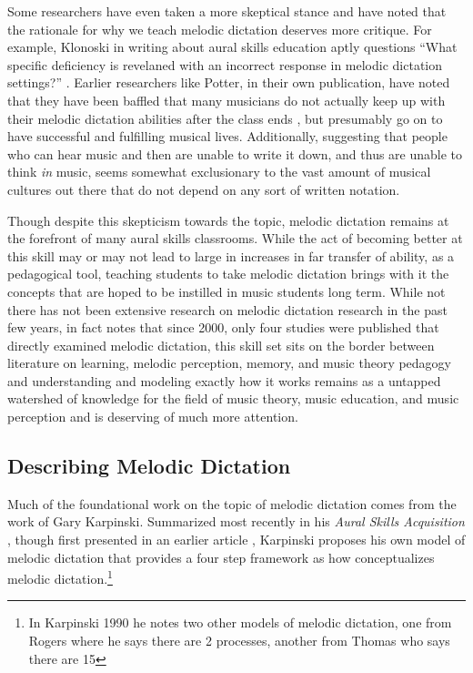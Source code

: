 \documentclass[]{book}
\let\rmarkdownfootnote\footnote%
\def\footnote{\protect\rmarkdownfootnote}
\theoremstyle{definition}
\theoremstyle{definition}
\theoremstyle{definition}
\theoremstyle{remark}
\begin{document}
Some researchers have even taken a more skeptical stance and have noted
that the rationale for why we teach melodic dictation deserves more
critique. For example, Klonoski in writing about aural skills education
aptly questions ``What specific deficiency is revelaned with an
incorrect response in melodic dictation settings?''
\citep{klonoskiImprovingDictationAuralSkills2006}. Earlier researchers
like Potter, in their own publication, have noted that they have been
baffled that many musicians do not actually keep up with their melodic
dictation abilities after the class ends
\citep{potterIdentifyingSucessfulDictation1990}, but presumably go on to
have successful and fulfilling musical lives. Additionally, suggesting
that people who can hear music and then are unable to write it down, and
thus are unable to think \emph{in} music, seems somewhat exclusionary to
the vast amount of musical cultures out there that do not depend on any
sort of written notation.

Though despite this skepticism towards the topic, melodic dictation
remains at the forefront of many aural skills classrooms. While the act
of becoming better at this skill may or may not lead to large in
increases in far transfer of ability, as a pedagogical tool, teaching
students to take melodic dictation brings with it the concepts that are
hoped to be instilled in music students long term. While not there has
not been extensive research on melodic dictation research in the past
few years, in fact \citep{paneyEffectDirectingAttention2016} notes that
since 2000, only four studies were published that directly examined
melodic dictation, this skill set sits on the border between literature
on learning, melodic perception, memory, and music theory pedagogy and
understanding and modeling exactly how it works remains as a untapped
watershed of knowledge for the field of music theory, music education,
and music perception and is deserving of much more attention.

\hypertarget{describing-melodic-dictation}{%
\subsection{Describing Melodic
Dictation}\label{describing-melodic-dictation}}

Much of the foundational work on the topic of melodic dictation comes
from the work of Gary Karpinski. Summarized most recently in his
\emph{Aural Skills Acquisition}
\citep{karpinskiAuralSkillsAcquisition2000}, though first presented in
an earlier article \citep{karpinskiModelMusicPerception1990}, Karpinski
proposes his own model of melodic dictation that provides a four step
framework as how conceptualizes melodic dictation.\footnote{In Karpinski
  1990 he notes two other models of melodic dictation, one from Rogers
  where he says there are 2 processes, another from Thomas who says
  there are 15}
\end{document}

